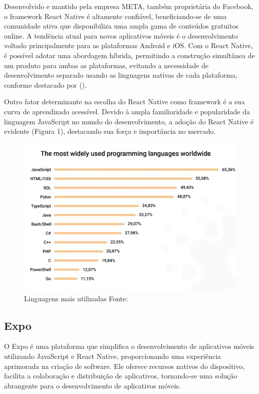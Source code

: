 Desenvolvido e mantido pela empresa META, também proprietária do Facebook, o framework React Native é altamente confiável, beneficiando-se de uma comunidade ativa 
que disponibiliza uma ampla gama de conteúdos gratuitos online. A tendência atual para novos aplicativos móveis é o desenvolvimento voltado principalmente para as 
plataformas Android e iOS. Com o React Native, é possível adotar uma abordagem híbrida, permitindo a construção simultânea de um produto para ambas as plataformas, 
evitando a necessidade de desenvolvimento separado usando as linguagens nativas de cada plataforma, conforme destacado por (\textcite{Sabino}).

Outro fator determinante na escolha do React Native como framework é a sua curva de aprendizado acessível. Devido à ampla familiaridade e popularidade da linguagem 
JavaScript no mundo do desenvolvimento, a adoção do React Native é evidente (Figura 1), destacando sua força e importância no mercado.




\begin{figure}[htb]
	\caption{\label{fig:Fig_1}Linguagens mais utilizadas Fonte: \cite{Softermii}}
	\begin{center}
		\includegraphics{images/top.png}
	\end{center}
\end{figure}
\clearpage
\subsection{Expo}
O Expo é uma plataforma que simplifica o desenvolvimento de aplicativos móveis utilizando JavaScript e React Native, proporcionando uma experiência aprimorada na criação de software. Ele oferece recursos nativos do dispositivo, facilita a colaboração e distribuição de aplicativos, tornando-se uma solução abrangente para o desenvolvimento de aplicativos móveis.

